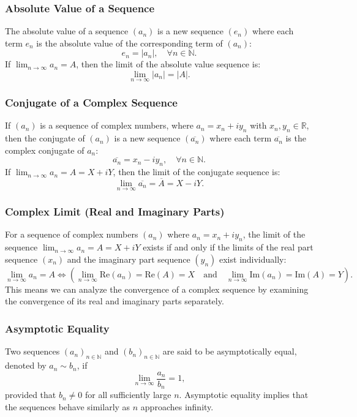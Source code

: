 \subsubsection{Absolute Value of a Sequence}
The absolute value of a sequence \((a_n)\) is a new sequence \((e_n)\) where each term \(e_n\) is the absolute value of the corresponding term of \((a_n)\):
\[
e_n = |a_n|, \quad \forall n \in \mathbb{N}.
\]
If \(\lim_{n \to \infty} a_n = A\), then the limit of the absolute value sequence is:
\[
\lim_{n \to \infty} |a_n| = |A|.
\]

\subsubsection{Conjugate of a Complex Sequence}
If \((a_n)\) is a sequence of complex numbers, where \(a_n = x_n + i y_n\) with \(x_n, y_n \in \mathbb{R}\), then the conjugate of \((a_n)\) is a new sequence \((\overline{a_n})\) where each term \(\overline{a_n}\) is the complex conjugate of \(a_n\):
\[
\overline{a_n} = x_n - i y_n, \quad \forall n \in \mathbb{N}.
\]
If \(\lim_{n \to \infty} a_n = A = X + i Y\), then the limit of the conjugate sequence is:
\[
\lim_{n \to \infty} \overline{a_n} = \overline{A} = X - i Y.
\]

\subsubsection{Complex Limit (Real and Imaginary Parts)}
For a sequence of complex numbers \((a_n)\) where \(a_n = x_n + i y_n\), the limit of the sequence \(\lim_{n \to \infty} a_n = A = X + i Y\) exists if and only if the limits of the real part sequence \((x_n)\) and the imaginary part sequence \((y_n)\) exist individually:
\[
\lim_{n \to \infty} a_n = A \iff \left( \lim_{n \to \infty} \text{Re}(a_n) = \text{Re}(A) = X \quad \text{and} \quad \lim_{n \to \infty} \text{Im}(a_n) = \text{Im}(A) = Y \right).
\]
This means we can analyze the convergence of a complex sequence by examining the convergence of its real and imaginary parts separately.

\subsubsection{Asymptotic Equality}
Two sequences \((a_n)_{n \in \mathbb{N}}\) and \((b_n)_{n \in \mathbb{N}}\) are said to be asymptotically equal, denoted by \(a_n \sim b_n\), if
\[
\lim_{n \to \infty} \frac{a_n}{b_n} = 1,
\]
provided that \(b_n \neq 0\) for all sufficiently large \(n\). Asymptotic equality implies that the sequences behave similarly as \(n\) approaches infinity.

\newpage
